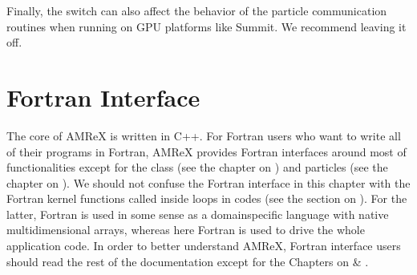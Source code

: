\documentclass[letterpaper,10pt,english]{sphinxmanual}
\begin{document}
\sphinxAtStartPar
Finally, the  switch can also affect the behavior of the particle communication routines when
running on GPU platforms like Summit. We recommend leaving it off.


\chapter{Fortran Interface}
\label{\detokenize{Fortran_Chapter:fortran-interface}}\label{\detokenize{Fortran_Chapter:chap-fortran}}\label{\detokenize{Fortran_Chapter::doc}}
\sphinxAtStartPar
The core of AMReX is written in C++. For Fortran users who want to write all of
their programs in Fortran, AMReX provides Fortran interfaces around most of
functionalities except for the  class (see the chapter on
{\hyperref[\detokenize{AmrLevel_Chapter:chap-amrlevel}]{}}) and particles (see the chapter on {\hyperref[\detokenize{Particle_Chapter:chap-particles}]{}}).
We should not confuse the Fortran interface in this chapter with the Fortran
kernel functions called inside  loops in codes (see the section
on {\hyperref[\detokenize{Basics:sec-basics-fortran}]{}}). For the latter, Fortran is used in some sense as
a domain\sphinxhyphen{}specific language with native multi\sphinxhyphen{}dimensional arrays, whereas here
Fortran is used to drive the whole application code. In order to better
understand AMReX, Fortran interface users should read the rest of the documentation
except for the Chapters on {\hyperref[\detokenize{AmrLevel_Chapter:chap-amrlevel}]{}} \& {\hyperref[\detokenize{Particle_Chapter:chap-particles}]{}}.
\end{document}
